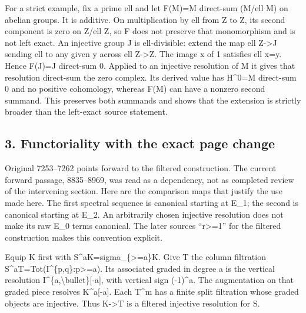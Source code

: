 For a strict example,\allowbreak{} fix a prime ell and let F(M)\allowbreak{}\allowbreak{}=M direct-sum (M/\allowbreak{}ell M)\allowbreak{} on abelian groups. It is additive. On multiplication by ell from Z to Z,\allowbreak{} its second component is zero on Z/\allowbreak{}ell Z,\allowbreak{} so F does not preserve that monomorphism and is not left exact. An injective group J is ell-divisible:\allowbreak{} extend the map ell Z\allowbreak{}->J sending ell to any given y across ell Z\allowbreak{}->Z. The image x of 1 satisfies ell x\allowbreak{}=y. Hence F(J)\allowbreak{}\allowbreak{}=J direct-sum 0. Applied to an injective resolution of M it gives that resolution direct-sum the zero complex. Its derived value has H\textasciicircum{}0\allowbreak{}=M direct-sum 0 and no positive cohomology,\allowbreak{} whereas F(M)\allowbreak{} can have a nonzero second summand. This preserves both summands and shows that the extension is strictly broader than the left-exact source statement.

\subsection{3. Functoriality with the exact page change}\label{proofs-7096-7578-functoriality-with-the-exact-page-change}

Original 7253–\allowbreak{}7262 points forward to the filtered construction. The current forward passage,\allowbreak{} 8835–\allowbreak{}8969,\allowbreak{} was read as a dependency,\allowbreak{} not as completed review of the intervening section. Here are the comparison maps that justify the use made here. The first spectral sequence is canonical starting at E\_\allowbreak{}1; the second is canonical starting at E\_\allowbreak{}2. An arbitrarily chosen injective resolution does not make its raw E\_\allowbreak{}0 terms canonical. The later source\textquotesingle s “r>\allowbreak{}=1” for the filtered construction makes this convention explicit.

Equip K first with S\textasciicircum{}aK\allowbreak{}=sigma\_\allowbreak{}\{>\allowbreak{}=a\}K. Give T the column filtration S\textasciicircum{}aT\allowbreak{}=Tot(I\textasciicircum{}\{p,\allowbreak{}q\}:\allowbreak{}p>\allowbreak{}=a)\allowbreak{}. Its associated graded in degree a is the vertical resolution I\textasciicircum{}\{a,\allowbreak{}\textbackslash{}bullet\}[-a]\allowbreak{},\allowbreak{} with vertical sign (-1)\allowbreak{}\textasciicircum{}a. The augmentation on that graded piece resolves K\textasciicircum{}a[-a]\allowbreak{}. Each T\^{}m has a finite split filtration whose graded objects are injective. Thus K\allowbreak{}->T is a filtered injective resolution for S.

